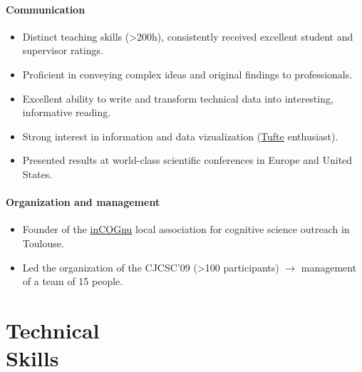\documentclass[margin,line]{resume}
\begin{document}
\begin{resume}
	\paragraph{Communication}
	\begin{itemize} \itemsep1pt \parskip0pt  \leftmargin=0em \itemindent=-1.5em
  		\item Distinct teaching skills (>200h), consistently received excellent student and supervisor ratings.
  		\item Proficient in conveying complex ideas and original findings to professionals.
  		\item Excellent ability to write and transform technical data into interesting, informative reading.
  		\item Strong interest in information and data vizualization (\href{http://www.edwardtufte.com/tufte/}{Tufte} enthusiast).
  		\item Presented results at world-class scientific conferences in Europe and United States.
	\end{itemize}
	
	\paragraph{Organization and management}
	\begin{itemize} \itemsep1pt \parskip0pt  \leftmargin=0em \itemindent=-1.5em
  		\item Founder of the \href{http://incognu.fr/}{inCOGnu} local association for cognitive science outreach in Toulouse.
  		\item Led the organization of the CJCSC'09 (>100 participants) $\rightarrow$ management of a team of 15 people.
	\end{itemize}

		
\newpage

\vspace{3mm}
    \section{\mysidestyle Technical\\Skills}


\end{resume}
\end{document}
